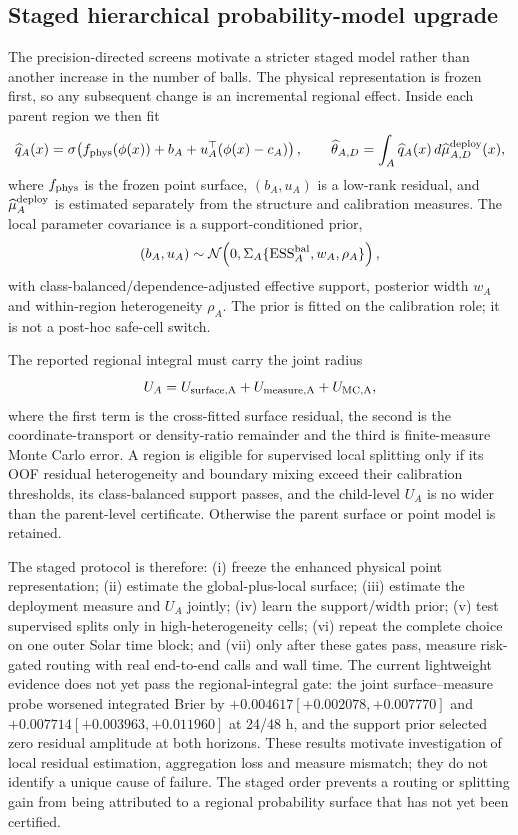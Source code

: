 \documentclass[11pt,a4paper]{article}
\numberwithin{equation}{section}
\theoremstyle{definition}\newtheorem{definition}[theorem]{Definition}
\theoremstyle{remark}\newtheorem{remark}[theorem]{Remark}
\begin{document}
\subsection{Staged hierarchical probability-model upgrade}
\label{sec:staged_hierarchical_upgrade}
The precision-directed screens motivate a stricter staged model rather than another increase in the number of balls. The physical representation is frozen first, so any subsequent change is an incremental regional effect. Inside each parent region we then fit
\[
 \widehat q_A(x)=\sigma\!\left(f_{\rm phys}(\phi(x))+b_A+u_A^\top(\phi(x)-c_A)\right),
 \qquad
 \widehat\theta_{A,D}=\int_A\widehat q_A(x)\,d\widehat\mu_{A,D}^{\rm deploy}(x),
\]
where $f_{\rm phys}$ is the frozen point surface, $(b_A,u_A)$ is a low-rank residual, and $\widehat\mu_A^{\rm deploy}$ is estimated separately from the structure and calibration measures. The local parameter covariance is a support-conditioned prior,
\[
 (b_A,u_A)\sim\mathcal N\!\left(0,\Sigma_A\{\operatorname{ESS}_{A}^{\rm bal},w_A,\rho_A\}\right),
\]
with class-balanced/dependence-adjusted effective support, posterior width $w_A$ and within-region heterogeneity $\rho_A$. The prior is fitted on the calibration role; it is not a post-hoc safe-cell switch.

The reported regional integral must carry the joint radius
\[
 U_A=U_{\rm surface,A}+U_{\rm measure,A}+U_{\rm MC,A},
\]
where the first term is the cross-fitted surface residual, the second is the coordinate-transport or density-ratio remainder and the third is finite-measure Monte Carlo error. A region is eligible for supervised local splitting only if its OOF residual heterogeneity and boundary mixing exceed their calibration thresholds, its class-balanced support passes, and the child-level $U_A$ is no wider than the parent-level certificate. Otherwise the parent surface or point model is retained.

The staged protocol is therefore: (i) freeze the enhanced physical point representation; (ii) estimate the global-plus-local surface; (iii) estimate the deployment measure and $U_A$ jointly; (iv) learn the support/width prior; (v) test supervised splits only in high-heterogeneity cells; (vi) repeat the complete choice on one outer Solar time block; and (vii) only after these gates pass, measure risk-gated routing with real end-to-end calls and wall time. The current lightweight evidence does not yet pass the regional-integral gate: the joint surface--measure probe worsened integrated Brier by $+0.004617[+0.002078,+0.007770]$ and $+0.007714[+0.003963,+0.011960]$ at 24/48 h, and the support prior selected zero residual amplitude at both horizons. These results motivate investigation of local residual estimation, aggregation loss and measure mismatch; they do not identify a unique cause of failure. The staged order prevents a routing or splitting gain from being attributed to a regional probability surface that has not yet been certified.
\end{document}
